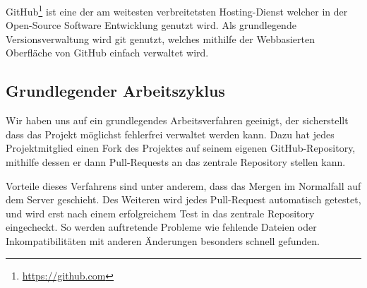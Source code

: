 GitHub\footnote{\url{https://github.com}} ist eine der am weitesten verbreitetsten Hosting-Dienst welcher in der Open-Source Software Entwicklung genutzt wird. Als grundlegende Versionsverwaltung wird git genutzt, welches mithilfe der Webbasierten Oberfl\"ache von GitHub einfach verwaltet wird.

\subsection{Grundlegender Arbeitszyklus}

Wir haben uns auf ein grundlegendes Arbeitsverfahren geeinigt, der sicherstellt dass das Projekt m\"oglichst fehlerfrei verwaltet werden kann. Dazu hat jedes Projektmitglied einen Fork des Projektes auf seinem eigenen GitHub-Repository, mithilfe dessen er dann Pull-Requests an das zentrale Repository stellen kann.

Vorteile dieses Verfahrens sind unter anderem, dass das Mergen im Normalfall auf dem Server geschieht. Des Weiteren wird jedes Pull-Request automatisch getestet, und wird erst nach einem erfolgreichem Test in das zentrale Repository eingecheckt. So werden auftretende Probleme wie fehlende Dateien oder Inkompatibilit\"aten mit anderen \"Anderungen besonders schnell gefunden.